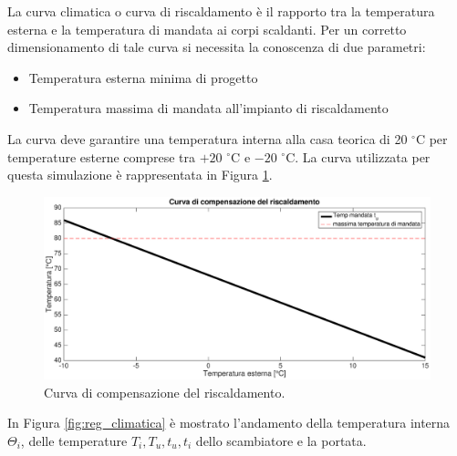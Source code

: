 \documentclass[laurea,oneside,11pt]{USiena_tesiLM}
\begin{document}
La curva climatica o curva di riscaldamento è il rapporto tra la temperatura esterna e la temperatura di mandata ai corpi scaldanti. Per un corretto dimensionamento di tale curva si necessita la conoscenza di due parametri:
\begin{itemize}
\item Temperatura esterna minima di progetto
\item Temperatura massima di mandata all'impianto di riscaldamento
\end{itemize}

La curva deve garantire una temperatura interna alla casa teorica di 20 $^{\circ}$C  per temperature esterne comprese tra $+20$ $^{\circ}$C e $-20$ $^{\circ}$C. La curva  utilizzata per questa simulazione è rappresentata in Figura \ref{fig:curva_comp}.
 
 \begin{figure}[!ht]
\centering
\includegraphics[width=\textwidth]{figure/curva_comp} 
\caption{Curva di compensazione del riscaldamento.}
\label{fig:curva_comp}
\end{figure}


In Figura \ref{fig:reg_climatica} è mostrato l'andamento della temperatura interna $\Theta_i$, delle temperature $T_i, T_u, t_u, t_i$ dello scambiatore e la portata.
\end{document}
